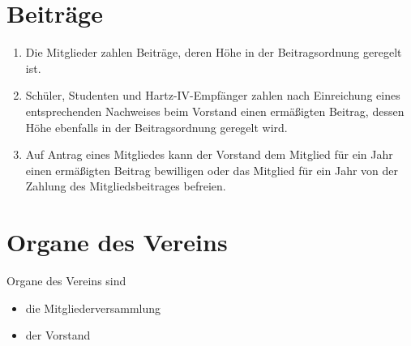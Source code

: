 \documentclass[a4paper,11pt]{scrartcl}
\begin{document}
\section{Beiträge}
\begin{enumerate}
  \item Die Mitglieder zahlen Beiträge, deren Höhe in der Beitragsordnung 
    geregelt ist.
  \item Schüler, Studenten und Hartz-IV-Empfänger zahlen nach Einreichung eines 
    entsprechenden Nachweises beim Vorstand einen ermäßigten Beitrag, dessen 
    Höhe ebenfalls in der Beitragsordnung geregelt wird.
  \item Auf Antrag eines Mitgliedes kann der Vorstand dem Mitglied für ein Jahr 
    einen ermäßigten Beitrag bewilligen oder das Mitglied für ein Jahr von der 
    Zahlung des Mitgliedsbeitrages befreien.
\end{enumerate}

\section{Organe des Vereins}
Organe des Vereins sind
\begin{itemize}
  \item die Mitgliederversammlung
  \item der Vorstand
\end{itemize}
\end{document}
